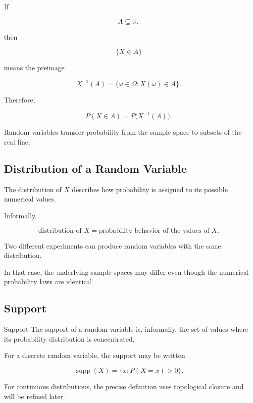 If

\[
A\subseteq\mathbb{R},
\]

then

\[
\{X\in A\}
\]

means the preimage

\[
\boxed{
X^{-1}(A)
=
\{\omega\in\Omega:X(\omega)\in A\}.
}
\]

Therefore,

\[
\boxed{
P(X\in A)
=
P\bigl(X^{-1}(A)\bigr).
}
\]

Random variables transfer probability from the sample space to subsets
of the real line.

\subsection{Distribution of a Random Variable}
\label{subsec:distribution-random-variable}

The distribution of \(X\) describes how probability is assigned to its
possible numerical values.

Informally,

\[
\boxed{
\text{distribution of }X
=
\text{probability behavior of the values of }X.
}
\]

Two different experiments can produce random variables with the same
distribution.

In that case, the underlying sample spaces may differ even though the
numerical probability laws are identical.

\subsection{Support}
\label{subsec:random-variable-support}

\begin{definitionbox}{Support}
The support of a random variable is, informally, the set of values where
its probability distribution is concentrated.
\end{definitionbox}

For a discrete random variable, the support may be written

\[
\boxed{
\operatorname{supp}(X)
=
\{x:P(X=x)>0\}.
}
\]

For continuous distributions, the precise definition uses topological
closure and will be refined later.

